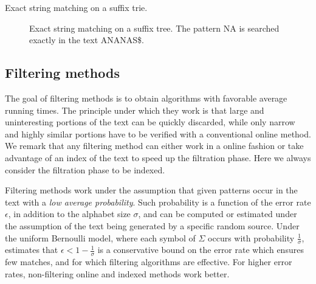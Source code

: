 \begin{algorithm}[h]
\caption{Exact string matching on a suffix trie.}
\label{alg:st-exact}
\begin{algorithmic}[1]
		\State \Report {}
			\State {}
	\EndIf
\EndProcedure
\end{algorithmic}
\end{algorithm}

\begin{figure}[h]
\begin{center}
\caption[Exact string matching on a suffix tree]{Exact string matching on a suffix tree. The pattern NA is searched exactly in the text ANANAS\$.}
\label{fig:st-exact}

\end{center}
\end{figure}



\subsection{Filtering methods}
\label{sec:intro:filtering}

The goal of filtering methods is to obtain algorithms with favorable average running times.
The principle under which they work is that large and uninteresting portions of the text can be quickly discarded, while only narrow and highly similar portions have to be verified with a conventional online method.
We remark that any filtering method can either work in a online fashion or take advantage of an index of the text to speed up the filtration phase.
Here we always consider the filtration phase to be indexed.

Filtering methods work under the assumption that given patterns occur in the text with a \emph{low average probability}.
Such probability is a function of the error rate $\epsilon$, in addition to the alphabet size $\sigma$, and can be computed or estimated under the assumption of the text being generated by a specific random source.
Under the uniform Bernoulli model, where each symbol of $\Sigma$ occurs with probability $\frac{1}{\sigma}$, \citet{Navarro2000} estimates that $\epsilon < 1 - \frac{1}{\sigma}$ is a conservative bound on the error rate which ensures few matches, and for which filtering algorithms are effective.
For higher error rates, non-filtering online and indexed methods work better.


